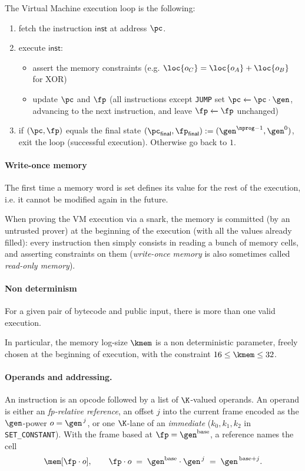 The Virtual Machine execution loop is the following:
\begin{enumerate}
  \item fetch the instruction $\mathsf{inst}$ at address $\pc$.
  \item execute $\mathsf{inst}$:
    \begin{itemize}
      \item assert the memory constraints (e.g. $\loc{o_C}=\loc{o_A}+\loc{o_B}$ for XOR)
      \item update $\pc$ and $\fp$ (all instructions except \texttt{JUMP} set $\pc \xleftarrow{} \pc \cdot \gen$, advancing to the next instruction, and leave $\fp \xleftarrow{} \fp$ unchanged)
    \end{itemize}
  \item if $(\pc,\fp)$ equals the final state $(\pc_{\textsf{final}},\fp_{\textsf{final}}) := (\gen^{\nprog - 1},\gen^{0})$, exit the loop (successful execution). Otherwise go back to $1.$
\end{enumerate}

\paragraph{Write-once memory}

The first time a memory word is set defines its value for the rest of the execution, i.e. it cannot be modified again in the future.

When proving the VM execution via a snark, the memory is committed (by an untrusted prover) at the beginning of the execution (with all the values already filled): every instruction then simply consists in reading a bunch of memory cells, and asserting constraints on them (\textit{write-once memory} is also sometimes called \textit{read-only memory}).

\paragraph{Non determinism}

For a given pair of bytecode and public input, there is more than one valid execution.

In particular, the memory log-size $\kmem$ is a non deterministic parameter, freely chosen at the beginning of execution, with the constraint $16\le\kmem\le 32$.

\paragraph{Operands and addressing.} An instruction is an opcode followed by a list of $\K$-valued operands. An operand is either an \emph{fp-relative reference}, an offset $j$ into the current frame encoded as the $\gen$-power $o=\gen^{\,j}$, or one $\K$-lane of an \emph{immediate} ($k_0,k_1,k_2$ in \texttt{SET\_CONSTANT}). With the frame based at $\fp=\gen^{\mathrm{base}}$, a reference names the cell
\[
  \mem[\fp\cdot o],\qquad \fp\cdot o\;=\;\gen^{\mathrm{base}}\cdot\gen^{\,j}\;=\;\gen^{\,\mathrm{base}+j}.
\]

